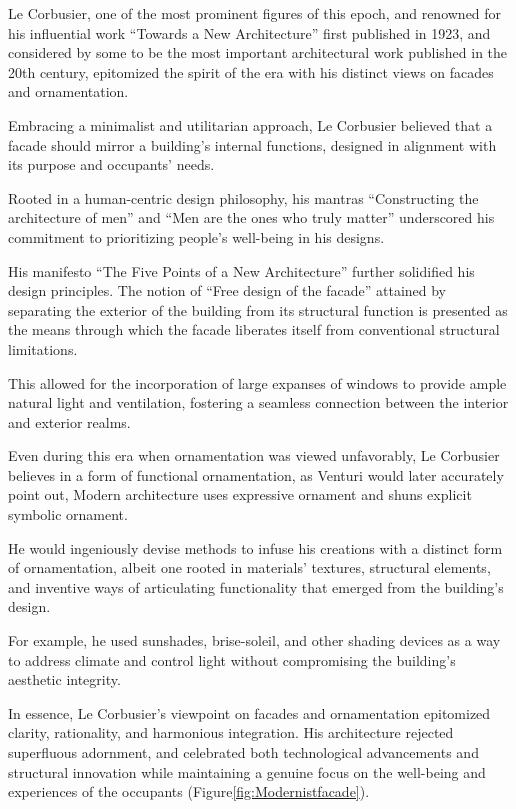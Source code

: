 Le Corbusier, one of the most prominent figures of this epoch, and renowned for his influential work ``Towards a New Architecture'' first published in 1923, and considered by some to be the most important architectural work published in the 20th century, epitomized the spirit of the era with his distinct views on facades and ornamentation\cite{Studio2a2023}.

Embracing a minimalist and utilitarian approach, Le Corbusier believed that a facade should mirror a building's internal functions, designed in alignment with its purpose and occupants' needs.

Rooted in a human-centric design philosophy, his mantras ``Constructing the architecture of men'' and ``Men are the ones who truly matter'' underscored his commitment to prioritizing people's well-being in his designs\cite{Virseda2021}.

His manifesto ``The Five Points of a New Architecture'' further solidified his design principles.
The notion of ``Free design of the facade'' attained by separating the exterior of the building from its structural function is presented as the means through which the facade liberates itself from conventional structural limitations\cite{Corbusier1986}.

This allowed for the incorporation of large expanses of windows to provide ample natural light and ventilation, fostering a seamless connection between the interior and exterior realms.

Even during this era when ornamentation was viewed unfavorably, Le Corbusier believes in a form of functional ornamentation, as Venturi\cite{Venturi1972} would later accurately point out, Modern architecture uses expressive ornament and shuns explicit symbolic  ornament.

He would ingeniously devise methods to infuse his creations with a distinct form of ornamentation, albeit one rooted in materials' textures, structural elements, and inventive ways of articulating functionality\cite{Saglam2014} that emerged from the building's design.

For example, he used sunshades, brise-soleil, and other shading devices as a way to address climate and control light without compromising the building's aesthetic integrity.

In essence, Le Corbusier's viewpoint on facades and ornamentation epitomized clarity, rationality, and harmonious integration.
His architecture rejected superfluous adornment, and celebrated both technological advancements and structural innovation while maintaining a genuine focus on the well-being and experiences of the occupants (Figure\ref{fig:Modernistfacade}).

